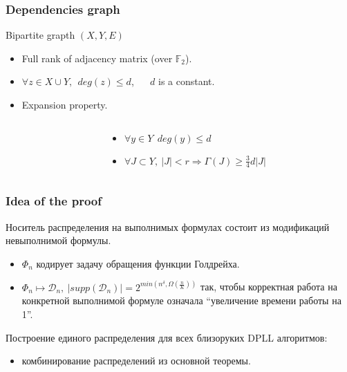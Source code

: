 \begin{frame}
    \frametitle{Dependencies graph}

    Bipartite grapth $(X, Y, E)$
    \pause
    \begin{itemize}
	    \item Full rank of adjacency matrix (over $\mathbb{F}_2$).
    	\pause
        \item $\forall z \in X \cup Y, ~~ deg(z) \le d$, ~~ $d$ is a constant.
    	\pause
        \item Expansion property.
    \end{itemize}

    \pause

    \begin{columns}
        \begin{column}{5cm}
            
        \end{column}

        \pause
        \pause
        \pause
        \begin{column}{5cm}
            \begin{itemize}
                \item $\forall y \in Y ~~ deg(y) \le d$
            	\pause
	            \item $\forall J \subset Y, ~
            		|J| < r \Rightarrow \Gamma(J) \ge \frac{3}{4}d|J|$
            \end{itemize}
		\end{column}
    \end{columns}

\end{frame}

\begin{frame}
	\frametitle{Idea of the proof}

    \pause
    Носитель распределения на выполнимых формулах состоит из
    модификаций невыполнимой формулы.
	\pause
    \begin{itemize}
        \item $\Phi_n$ кодирует задачу обращения функции Голдрейха.
    	\pause
    	\item $\Phi_n \mapsto \mathcal{D}_n, ~ |supp(\mathcal{D}_n)| =
		    2^{min(n^\delta, \Omega(\frac{n}{K}))}$ так, чтобы корректная
		    работа на конкретной выполнимой формуле означала
            ``увеличение времени работы на 1''.
	\end{itemize}

    \pause
    Построение единого распределения для всех близоруких DPLL
    алгоритмов:
    
    \pause
    \begin{itemize}
        \item комбинирование распределений из основной теоремы.
    \end{itemize}
\end{frame}

